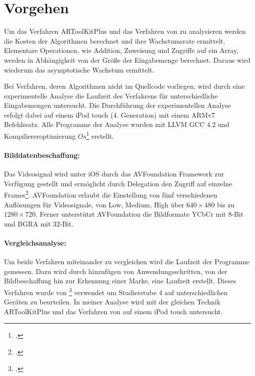 \section{Vorgehen} %
\label{sec:vorgehen}
\begin{comment}
	Vorgehen: Analysemethoden vorstellen wie Algorithmen untersucht werden.
	Vergleich O-Notation
	Laufzeitanalyse
	Gleiche Kriterien (selbes Bild, selbes Video)
\end{comment}

Um das Verfahren ARToolKitPlus und das Verfahren von \citeauthor{hirzer08} zu analysieren werden die Kosten der
 Algorithmen berechnet und ihre Wachstumsrate ermittelt. Elementare Operationen, wie Addition, Zuweisung und
 Zugriffe auf ein Array, werden in Abhängigkeit von der Größe der Eingabemenge berechnet. Daraus wird wiederum das
 asymptotische Wachstum ermittelt.

Bei Verfahren, deren Algorithmen nicht im Quellcode vorliegen, wird durch eine experimentelle Analyse die Laufzeit des
 Verfahrens für unterschiedliche Eingabemengen untersucht. Die Durchführung der experimentellen Analyse erfolgt dabei
 auf einem iPod touch (4. Generation) mit einem ARMv7 Befehlssatz. Alle Programme der Analyse wurden mit LLVM GCC 4.2
 und Kompiliereroptimierung $\mathit{Os}$\footcite[Vgl.][]{cc} erstellt.

\paragraph{Bilddatenbeschaffung:} %
\label{par:bilddatenbeschaffung}
Das Videosignal wird unter iOS durch das AVFoundation Framework zur Verfügung gestellt und ermöglicht durch Delegation
 den Zugriff auf einzelne Frames\footcite{avfoundation}. AVFoundation erlaubt die Einstellung von fünf verschiedenen
 Auflösungen für Videosignale, von Low, Medium, High über $640 \times 480$ bis zu $1280 \times 720$. Ferner unterstützt
 AVFoundation die Bildformate YCbCr mit $8$-Bit und BGRA mit $32$-Bit.

\paragraph{Vergleichsanalyse:} %
\label{par:vergleichsanalyse}
Um beide Verfahren miteinander zu vergleichen wird die Laufzeit der Programme gemessen. Dazu wird durch hinzufügen von
 Anwendungsschritten, von der Bildbeschaffung hin zur Erkennung einer Marke, eine Laufzeit erstellt. Dieses Verfahren
 wurde von \citeauthor{wagner09b}\footcite[Vgl.][]{wagner09b} verwendet um Studierstube 4 auf unterschiedlichen Geräten
 zu beurteilen. In meiner Analyse wird mit der gleichen Technik ARToolKitPlus und das Verfahren von
 \citeauthor{hirzer08} auf einem iPod touch untersucht.

